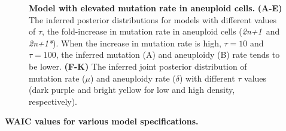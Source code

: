 \documentclass[12pt]{extarticle}
\newcommand{\anwt}{\emph{2n+1}}
\newcommand{\anmt}{\emph{2n+1*}}
\begin{document}
\begin{figure}[h!]
\begin{subfigure}{0.325\textwidth}
  \end{subfigure}
  \caption{
    \textbf{Model with elevated mutation rate in aneuploid cells.}  \textbf{(A-E)} The inferred posterior distributions for models with different values of $\tau$, the fold-increase in mutation rate in aneuploid cells (\anwt\ and \anmt). When the increase in mutation rate is high, $\tau=10$ and $\tau=100$, the inferred mutation (A) and aneuploidy (B) rate tends to be lower. 
    \textbf{(F-K)} The inferred joint posterior distribution of mutation rate ($\mu$) and aneuploidy rate ($\delta$) with different $\tau$ values (dark purple and bright yellow for low and high density, respectively).
  \label{fig:tau}
  }
  
  \end{figure}
 
\begin{table}[h]
\centering
\caption{
\textbf{WAIC values for various model specifications.}}
\caption*{
	TODO caption
} 
\label{table:WAIC}
\end{table}
\end{document}
